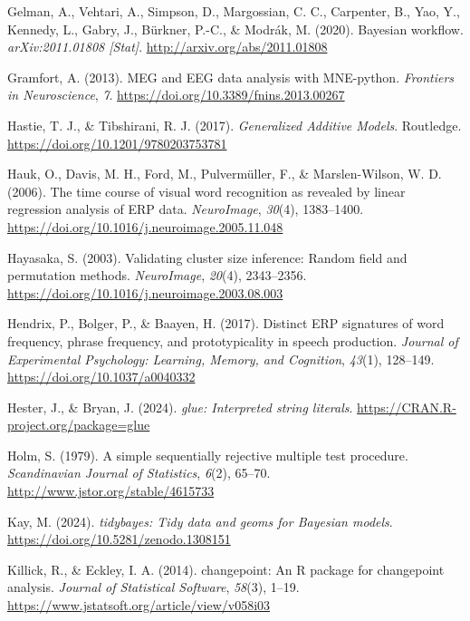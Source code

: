 \documentclass[
  doc,
  floatsintext,
  longtable,
  a4paper,
  nolmodern,
  notxfonts,
  notimes,
  colorlinks=true,linkcolor=blue,citecolor=blue,urlcolor=blue]{apa7}
\newlength{\cslhangindent}
\newenvironment{CSLReferences}[2] %
 {\begin{list}{}{%
  \setlength{\itemindent}{0pt}
  \setlength{\leftmargin}{0pt}
  \setlength{\parsep}{0pt}
  \ifodd #1
   \setlength{\leftmargin}{\cslhangindent}
   \setlength{\itemindent}{-1\cslhangindent}
  \fi
  \setlength{\itemsep}{#2\baselineskip}}}
 {\end{list}}
\begin{document}
\begin{CSLReferences}{1}{0}
Gelman, A., Vehtari, A., Simpson, D., Margossian, C. C., Carpenter, B.,
Yao, Y., Kennedy, L., Gabry, J., Bürkner, P.-C., \& Modrák, M. (2020).
Bayesian workflow. \emph{arXiv:2011.01808 {[}Stat{]}}.
\url{http://arxiv.org/abs/2011.01808}

Gramfort, A. (2013). MEG and EEG data analysis with MNE-python.
\emph{Frontiers in Neuroscience}, \emph{7}.
\url{https://doi.org/10.3389/fnins.2013.00267}

Hastie, T. J., \& Tibshirani, R. J. (2017). \emph{Generalized Additive
Models}. Routledge. \url{https://doi.org/10.1201/9780203753781}

Hauk, O., Davis, M. H., Ford, M., Pulvermüller, F., \& Marslen-Wilson,
W. D. (2006). The time course of visual word recognition as revealed by
linear regression analysis of ERP data. \emph{NeuroImage}, \emph{30}(4),
1383--1400. \url{https://doi.org/10.1016/j.neuroimage.2005.11.048}

Hayasaka, S. (2003). Validating cluster size inference: Random field and
permutation methods. \emph{NeuroImage}, \emph{20}(4), 2343--2356.
\url{https://doi.org/10.1016/j.neuroimage.2003.08.003}

Hendrix, P., Bolger, P., \& Baayen, H. (2017). Distinct ERP signatures
of word frequency, phrase frequency, and prototypicality in speech
production. \emph{Journal of Experimental Psychology: Learning, Memory,
and Cognition}, \emph{43}(1), 128--149.
\url{https://doi.org/10.1037/a0040332}

Hester, J., \& Bryan, J. (2024). \emph{{glue}: Interpreted string
literals}. \url{https://CRAN.R-project.org/package=glue}

Holm, S. (1979). A simple sequentially rejective multiple test
procedure. \emph{Scandinavian Journal of Statistics}, \emph{6}(2),
65--70. \url{http://www.jstor.org/stable/4615733}

Kay, M. (2024). \emph{{tidybayes}: Tidy data and geoms for {Bayesian}
models}. \url{https://doi.org/10.5281/zenodo.1308151}

Killick, R., \& Eckley, I. A. (2014). {changepoint}: An {R} package for
changepoint analysis. \emph{Journal of Statistical Software},
\emph{58}(3), 1--19.
\url{https://www.jstatsoft.org/article/view/v058i03}


\end{CSLReferences}
\end{document}
